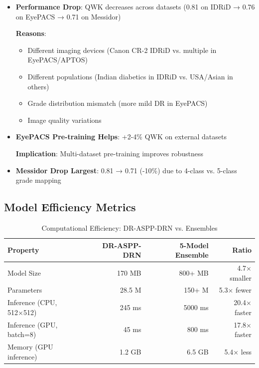 \documentclass[12pt,a4paper]{article}
\begin{document}
\begin{itemize}
    \item \textbf{Performance Drop}: QWK decreases across datasets (0.81 on IDRiD → 0.76 on EyePACS → 0.71 on Messidor)
    
    \textbf{Reasons}:
    \begin{itemize}
        \item Different imaging devices (Canon CR-2 IDRiD vs. multiple in EyePACS/APTOS)
        \item Different populations (Indian diabetics in IDRiD vs. USA/Asian in others)
        \item Grade distribution mismatch (more mild DR in EyePACS)
        \item Image quality variations
    \end{itemize}
    
    \item \textbf{EyePACS Pre-training Helps}: +2-4\% QWK on external datasets
    
    \textbf{Implication}: Multi-dataset pre-training improves robustness
    
    \item \textbf{Messidor Drop Largest}: 0.81 → 0.71 (-10\%) due to 4-class vs. 5-class grade mapping
\end{itemize}

\subsection{Model Efficiency Metrics}

\begin{table}[H]
\centering
\small
\caption{Computational Efficiency: DR-ASPP-DRN vs. Ensembles}
\begin{tabular}{|l|r|r|r|}
\hline
\textbf{Property} & \textbf{DR-ASPP-DRN} & \textbf{5-Model Ensemble} & \textbf{Ratio} \\
\hline
Model Size & 170 MB & 800+ MB & 4.7× smaller \\
Parameters & 28.5 M & 150+ M & 5.3× fewer \\
Inference (CPU, 512×512) & 245 ms & 5000 ms & 20.4× faster \\
Inference (GPU, batch=8) & 45 ms & 800 ms & 17.8× faster \\
Memory (GPU inference) & 1.2 GB & 6.5 GB & 5.4× less \\
\hline
\end{tabular}
\end{table}
\end{document}

